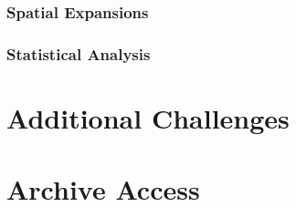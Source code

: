 \documentclass[
]{book}
\begin{document}
\hypertarget{spatial-expansions}{%
\subsection{Spatial Expansions}\label{spatial-expansions}}

\hypertarget{statistical-analysis}{%
\subsection{Statistical Analysis}\label{statistical-analysis}}

\hypertarget{additional-challenges}{%
\chapter{Additional Challenges}\label{additional-challenges}}

\hypertarget{archive-access}{%
\chapter{Archive Access}\label{archive-access}}

  
\end{document}
